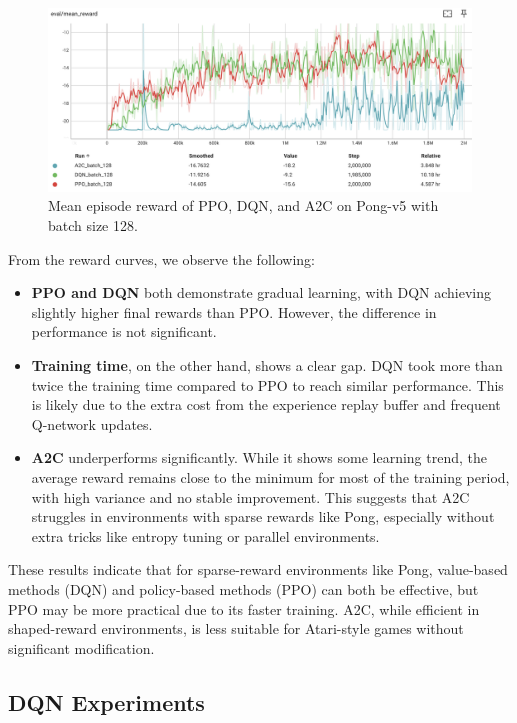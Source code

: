 \documentclass[10pt,twocolumn,letterpaper]{article}
\begin{document}
\begin{figure}[h]
  \centering
  \includegraphics[width=0.95\linewidth]{assets/4.3/Pong_algorithms.png}
  \caption{Mean episode reward of PPO, DQN, and A2C on Pong-v5 with batch size 128.}
  \label{fig:algo_comparison}
\end{figure}

\noindent
From the reward curves, we observe the following:

\begin{itemize}
  \item \textbf{PPO and DQN} both demonstrate gradual learning, with DQN achieving slightly higher final rewards than PPO. However, the difference in performance is not significant.
  \item \textbf{Training time}, on the other hand, shows a clear gap. DQN took more than twice the training time compared to PPO to reach similar performance. This is likely due to the extra cost from the experience replay buffer and frequent Q-network updates.
  \item \textbf{A2C} underperforms significantly. While it shows some learning trend, the average reward remains close to the minimum for most of the training period, with high variance and no stable improvement. This suggests that A2C struggles in environments with sparse rewards like Pong, especially without extra tricks like entropy tuning or parallel environments.
\end{itemize}

\noindent
These results indicate that for sparse-reward environments like Pong, value-based methods (DQN) and policy-based methods (PPO) can both be effective, but PPO may be more practical due to its faster training. A2C, while efficient in shaped-reward environments, is less suitable for Atari-style games without significant modification.

\subsection{DQN Experiments}
\end{document}
